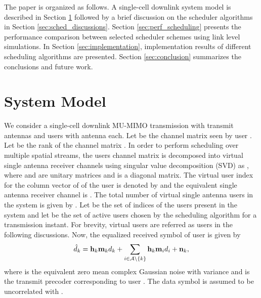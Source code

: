 \documentclass[conference,letterpaper,10pt]{./../../IEEE/IEEEtran}
\begin{document}
The paper is organized as follows. A single-cell downlink system model is described in Section \ref{sec:system_model} followed by a brief discussion on the scheduler algorithms in Section \ref{sec:sched_discussions}. Section \ref{sec:perf_scheduling} presents the performance comparison between selected scheduler schemes using link level simulations. In Section \ref{sec:implementation}, implementation results of different scheduling algorithms are presented. Section \ref{sec:conclusion} summarizes the conclusions and future work.

\section{System Model}
\label{sec:system_model}
We consider a single-cell downlink \ac{MU-MIMO} transmission with  transmit antennas and  users with  antenna each. Let  be the channel matrix seen by user . Let  be the rank of the channel matrix . In order to perform scheduling over multiple spatial streams, the users channel matrix  is decomposed into  virtual single antenna receiver channels using singular value decomposition (SVD) as , where  and  are unitary matrices and  is a diagonal matrix. 
The virtual user index for the  column vector of  of the  user is denoted by  and the equivalent single antenna receiver channel is . The total number of virtual single antenna users in the system is given by . Let  be the set of indices of the users present in the system and let  be the set of active users chosen by the scheduling algorithm for a transmission instant. For brevity, virtual users are referred as users in the following discussions. Now, the equalized received symbol  of user  is given by
\begin{equation}
\hat{d}_k = \mathbf{h}_{k} \mathbf{m}_{k} d_k + \sum_{i \in \mathcal{A} \backslash \{k\}} \mathbf{h}_{k} \mathbf{m}_{i} d_i + \mathbf{n}_{k},
\end{equation}
where  is the equivalent zero mean complex Gaussian noise with variance  and  is the transmit precoder corresponding to user . The data symbol  is assumed to be uncorrelated with .
\end{document}

